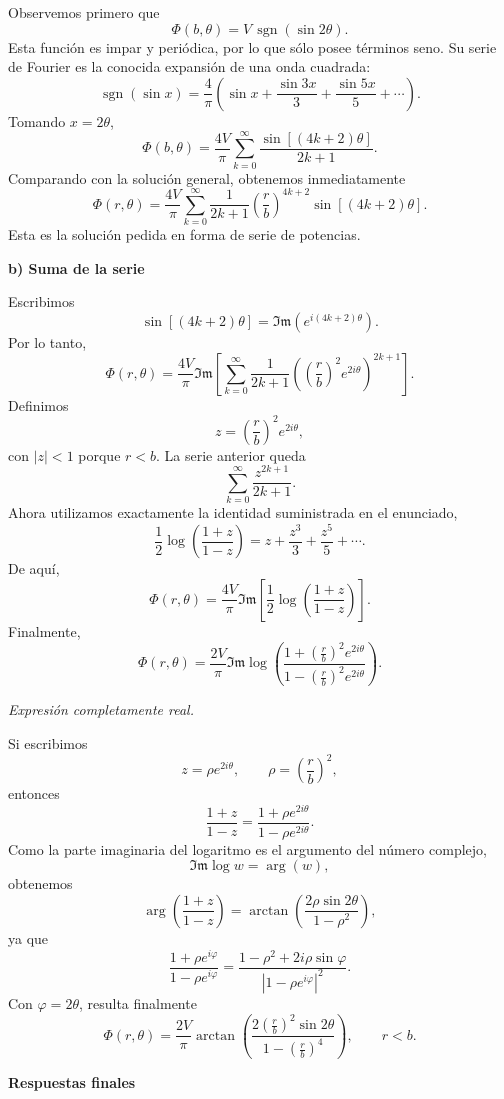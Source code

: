 \documentclass[11pt,spanish]{article}
\renewcommand{\Im}{\mathfrak{Im}}
\begin{document}
Observemos primero que
$$
\boxed{
\Phi(b,\theta)
=
V\,\operatorname{sgn}(\sin2\theta).
}
$$
Esta función es impar y periódica, por lo que sólo posee términos seno.
Su serie de Fourier es la conocida expansión de una onda cuadrada:
$$
\boxed{
\operatorname{sgn}(\sin x)
=
\frac4\pi
\left(
\sin x
+\frac{\sin3x}{3}
+\frac{\sin5x}{5}
+\cdots
\right).
}
$$
Tomando $x=2\theta$,
$$
\boxed{
\Phi(b,\theta)
=
\frac{4V}{\pi}
\sum_{k=0}^{\infty}
\frac{\sin[(4k+2)\theta]}{2k+1}.
}
$$
Comparando con la solución general, obtenemos inmediatamente
$$
\boxed{
\Phi(r,\theta)
=
\frac{4V}{\pi}
\sum_{k=0}^{\infty}
\frac1{2k+1}
\left(\frac rb\right)^{4k+2}
\sin[(4k+2)\theta].
}
$$
Esta es la solución pedida en forma de serie de potencias.

{\bf b) Suma de la serie}

Escribimos
$$
\sin[(4k+2)\theta]
=
\Im\left(e^{i(4k+2)\theta}\right).
$$
Por lo tanto,
$$
\Phi(r,\theta)
=
\frac{4V}{\pi}
\Im\left[
\sum_{k=0}^{\infty}
\frac1{2k+1}
\left(
\left(\frac rb\right)^2
e^{2i\theta}
\right)^{2k+1}
\right].
$$
Definimos
$$
z=
\left(\frac rb\right)^2e^{2i\theta},
$$
con $|z|<1$ porque $r<b$.
La serie anterior queda
$$
\sum_{k=0}^{\infty}\frac{z^{2k+1}}{2k+1}.
$$
Ahora utilizamos exactamente la identidad suministrada en el enunciado,
$$
\frac12
\log\left(\frac{1+z}{1-z}\right)
=
z+\frac{z^3}{3}+\frac{z^5}{5}+\cdots.
$$
De aquí,
$$
\Phi(r,\theta)
=
\frac{4V}{\pi}
\Im\left[
\frac12
\log\left(\frac{1+z}{1-z}\right)
\right].
$$
Finalmente,
$$
\boxed{
\Phi(r,\theta)
=
\frac{2V}{\pi}
\Im
\log
\left(
\frac{1+\left(\frac rb\right)^2e^{2i\theta}}
{1-\left(\frac rb\right)^2e^{2i\theta}}
\right).
}
$$

{\em Expresión completamente real.}

Si escribimos
$$
z=\rho e^{2i\theta},
\qquad
\rho=\left(\frac rb\right)^2,
$$
entonces
$$
\frac{1+z}{1-z}
=
\frac{1+\rho e^{2i\theta}}
{1-\rho e^{2i\theta}}.
$$
Como la parte imaginaria del logaritmo es el argumento del número complejo,
$$
\Im\log w=\arg(w),
$$
obtenemos
$$
\arg\left(\frac{1+z}{1-z}\right)
=
\arctan\left(
\frac{2\rho\sin2\theta}
{1-\rho^2}
\right),
$$
ya que
$$
\frac{1+\rho e^{i\varphi}}
{1-\rho e^{i\varphi}}
=
\frac{1-\rho^2+2i\rho\sin\varphi}
{|1-\rho e^{i\varphi}|^2}.
$$
Con $\varphi=2\theta$, resulta finalmente
$$
\boxed{
\Phi(r,\theta)
=
\frac{2V}{\pi}
\arctan\left(
\frac{
2\left(\frac rb\right)^2\sin2\theta
}{
1-\left(\frac rb\right)^4
}
\right),
\qquad r<b.
}
$$

{\bf Respuestas finales}
\end{document}
